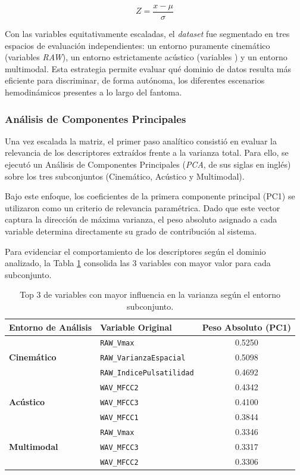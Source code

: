 \begin{equation}
    Z = \frac{x - \mu}{\sigma}
    \label{eq:normalización_z}
\end{equation}

Con las variables equitativamente escaladas, el \textit{dataset} fue segmentado en tres espacios de evaluación independientes: un entorno puramente cinemático (variables \textit{RAW}), un entorno estrictamente acústico (variables ) y un entorno multimodal. Esta estrategia permite evaluar qué dominio de datos resulta más eficiente para discriminar, de forma autónoma, los diferentes escenarios hemodinámicos presentes a lo largo del fantoma.

\subsubsection{Análisis de Componentes Principales}

Una vez escalada la matriz, el primer paso analítico consistió en evaluar la relevancia de los descriptores extraídos frente a la varianza total. Para ello, se ejecutó un Análisis de Componentes Principales (\textit{PCA}, de sus siglas en inglés) sobre los tres subconjuntos (Cinemático, Acústico y Multimodal).

Bajo este enfoque, los coeficientes de la primera componente principal (PC1) se utilizaron como un criterio de relevancia paramétrica. Dado que este vector captura la dirección de máxima varianza, el peso absoluto asignado a cada variable determina directamente su grado de contribución al sistema.

Para evidenciar el comportamiento de los descriptores según el dominio analizado, la Tabla \ref{tab:pesos_pca_comparativo} consolida las 3 variables con mayor valor para cada subconjunto.

\begin{table}[H]
\centering
\caption{Top 3 de variables con mayor influencia en la varianza según el entorno subconjunto.}
\label{tab:pesos_pca_comparativo}
\begin{tabular}{llc}
\hline
\textbf{Entorno de Análisis} & \textbf{Variable Original} & \textbf{Peso Absoluto (PC1)} \\ \hline
\multirow{3}{*}{\textbf{Cinemático}} 
 & \texttt{RAW\_Vmax} & 0.5250 \\
 & \texttt{RAW\_VarianzaEspacial} & 0.5098 \\
 & \texttt{RAW\_IndicePulsatilidad} & 0.4692 \\ \hline
\multirow{3}{*}{\textbf{Acústico}} 
 & \texttt{WAV\_MFCC2} & 0.4342 \\
 & \texttt{WAV\_MFCC3} & 0.4100 \\
 & \texttt{WAV\_MFCC1} & 0.3844 \\ \hline
\multirow{3}{*}{\textbf{Multimodal}} 
 & \texttt{RAW\_Vmax} & 0.3346 \\
 & \texttt{WAV\_MFCC3} & 0.3317 \\
 & \texttt{WAV\_MFCC2} & 0.3306 \\ \hline
\end{tabular}
\end{table}


